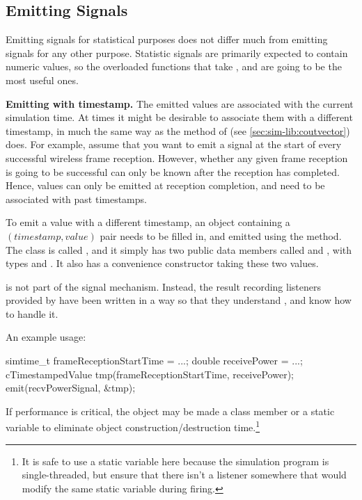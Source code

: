 \subsection{Emitting Signals}
\label{sec:simple-modules:emitting-statistic-signals}

Emitting signals for statistical purposes does not differ much from
emitting signals for any other purpose. Statistic signals are primarily
expected to contain numeric values, so the overloaded  functions
that take ,  and  are going to be the
most useful ones.

\textbf{Emitting with timestamp.} The emitted values are associated with
the current simulation time. At times it might be desirable to associate
them with a different timestamp, in much the same way as the
 method of  (see
\ref{sec:sim-lib:coutvector}) does. For example, assume that you want to
emit a signal at the start of every successful wireless frame reception.
However, whether any given frame reception is going to be successful can
only be known after the reception has completed. Hence, values can only be
emitted at reception completion, and need to be associated with past
timestamps.

To emit a value with a different timestamp, an object containing
a $(timestamp, value)$ pair needs to be filled in, and emitted using
the  method. The class is called
, and it simply has two public data members called
 and , with types  and .
It also has a convenience constructor taking these two values.

\begin{note}
 is not part of the signal mechanism. Instead,
the result recording listeners provided by {\opp} have been written
in a way so that they understand , and know how
to handle it.
\end{note}

An example usage:

\begin{cpp}
simtime_t frameReceptionStartTime = ...;
double receivePower = ...;
cTimestampedValue tmp(frameReceptionStartTime, receivePower);
emit(recvPowerSignal, &tmp);
\end{cpp}

If performance is critical, the  object may be
made a class member or a static variable to eliminate object
construction/destruction time.\footnote{It is safe to use a static
variable here because the simulation program is single-threaded,
but ensure that there isn't a listener somewhere that would modify
the same static variable during firing.}

